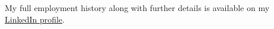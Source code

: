 \begin{justify}
My full employment history along with further details is available on my \href{https://uk.linkedin.com/in/laywill}{LinkedIn profile}.
\end{justify}
\vspace{-\topsep} %
